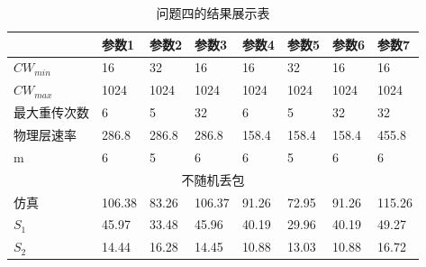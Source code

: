 \documentclass[bwprint]{gmcmthesis}
\begin{document}
\begin{table}[H]
\caption{问题四的结果展示表}
\begin{tabular}{|llllllll|}
\hline
\multicolumn{1}{|l|}{}       & \multicolumn{1}{l|}{参数1}    & \multicolumn{1}{l|}{参数2}   & \multicolumn{1}{l|}{参数3}    & \multicolumn{1}{l|}{参数4}   & \multicolumn{1}{l|}{参数5}   & \multicolumn{1}{l|}{参数6}   & 参数7    \\ \hline
\multicolumn{1}{|l|}{$CW_{min}$} & \multicolumn{1}{l|}{16}     & \multicolumn{1}{l|}{32}    & \multicolumn{1}{l|}{16}     & \multicolumn{1}{l|}{16}    & \multicolumn{1}{l|}{32}    & \multicolumn{1}{l|}{16}    & 16     \\ \hline
\multicolumn{1}{|l|}{$CW_{max}$} & \multicolumn{1}{l|}{1024}   & \multicolumn{1}{l|}{1024}  & \multicolumn{1}{l|}{1024}   & \multicolumn{1}{l|}{1024}  & \multicolumn{1}{l|}{1024}  & \multicolumn{1}{l|}{1024}  & 1024   \\ \hline
\multicolumn{1}{|l|}{最大重传次数} & \multicolumn{1}{l|}{6}      & \multicolumn{1}{l|}{5}     & \multicolumn{1}{l|}{32}     & \multicolumn{1}{l|}{6}     & \multicolumn{1}{l|}{5}     & \multicolumn{1}{l|}{32}    & 32     \\ \hline
\multicolumn{1}{|l|}{物理层速率}  & \multicolumn{1}{l|}{286.8}  & \multicolumn{1}{l|}{286.8} & \multicolumn{1}{l|}{286.8}  & \multicolumn{1}{l|}{158.4} & \multicolumn{1}{l|}{158.4} & \multicolumn{1}{l|}{158.4} & 455.8  \\ \hline
\multicolumn{1}{|l|}{m}      & \multicolumn{1}{l|}{6}      & \multicolumn{1}{l|}{5}     & \multicolumn{1}{l|}{6}      & \multicolumn{1}{l|}{6}     & \multicolumn{1}{l|}{5}     & \multicolumn{1}{l|}{6}     & 6      \\ \hline
\multicolumn{8}{|c|}{不随机丢包}                                                                                                                                                                                           \\ \hline
\multicolumn{1}{|l|}{仿真}     & \multicolumn{1}{l|}{106.38} & \multicolumn{1}{l|}{83.26} & \multicolumn{1}{l|}{106.37} & \multicolumn{1}{l|}{91.26} & \multicolumn{1}{l|}{72.95} & \multicolumn{1}{l|}{91.26} & 115.26 \\ \hline
\multicolumn{1}{|l|}{$S_1$}    & \multicolumn{1}{l|}{45.97}  & \multicolumn{1}{l|}{33.48} & \multicolumn{1}{l|}{45.96}  & \multicolumn{1}{l|}{40.19} & \multicolumn{1}{l|}{29.96} & \multicolumn{1}{l|}{40.19} & 49.27  \\ \hline
\multicolumn{1}{|l|}{$S_2$}    & \multicolumn{1}{l|}{14.44}  & \multicolumn{1}{l|}{16.28} & \multicolumn{1}{l|}{14.45}  & \multicolumn{1}{l|}{10.88} & \multicolumn{1}{l|}{13.03} & \multicolumn{1}{l|}{10.88} & 16.72  \\ \hline

\end{tabular}
\end{table}
\end{document}
